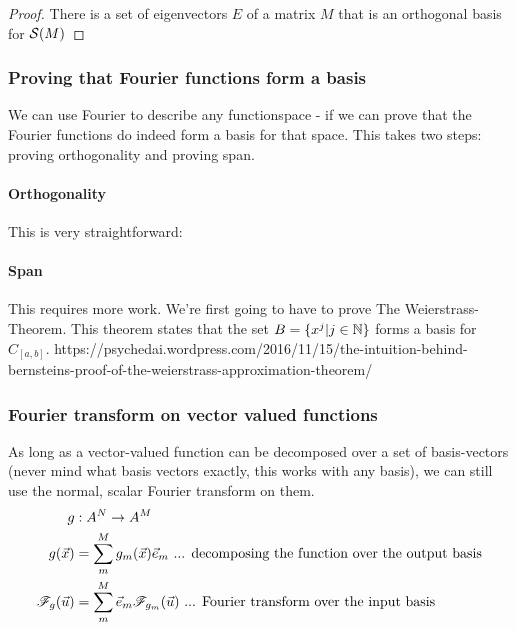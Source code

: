 \begin{proof}There is a set of eigenvectors $E$ of a matrix $M$ that is an orthogonal basis for $\mathcal{S}(M)$
    \subprf{}{}{}
\end{proof}



\subsubsection{Proving that Fourier functions form a basis}

We can use Fourier to describe any functionspace - if we can prove that the Fourier functions do indeed form a basis for that space. This takes two steps: proving orthogonality and proving span.

\paragraph{Orthogonality} This is very straightforward: 

\paragraph{Span} This  requires more work.  We're first going to have to prove The Weierstrass-Theorem. This theorem states that the set $B = \{ x^j | j \in \mathbb{N} \}$ forms a basis for $C_{[a,b]}$.
https://psychedai.wordpress.com/2016/11/15/the-intuition-behind-bernsteins-proof-of-the-weierstrass-approximation-theorem/


\subsubsection{Fourier transform on vector valued functions}
As long as a vector-valued function can be decomposed over a set of basis-vectors (never mind what basis vectors exactly, this works with any basis), we can still use the normal, scalar Fourier transform on them. 
\begin{equation}
    \begin{split}
        g &: A^N \to A^M \\
        g(\vec{x}) &= \sum_m^M g_m(\vec{x}) \vec{e}_m \text{ ... decomposing the function over the output basis} \\
        \mathscr{F}_g(\vec{u}) &= \sum_m^M \vec{e}_m \mathscr{F}_{g_m}(\vec{u})  \text{ ... Fourier transform over the input basis}
    \end{split}
\end{equation}

